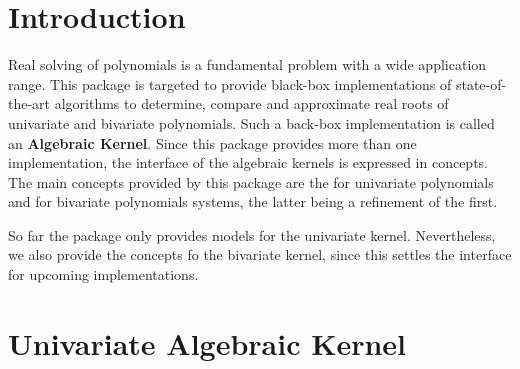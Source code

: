 
\section{Introduction}
Real solving of polynomials is a fundamental problem with a wide application range. 
This package is targeted to provide black-box implementations of state-of-the-art 
algorithms to determine, compare and approximate real roots of univariate and 
bivariate polynomials. Such a back-box implementation is called an {\bf Algebraic Kernel}. Since  
this package provides more than one implementation, the interface of the algebraic kernels 
is expressed in concepts. The main concepts provided by this package are the 
 for univariate polynomials and  
for bivariate polynomials systems, the latter being a refinement of the first. 

So far the package only provides models for the univariate kernel. Nevertheless, 
we also provide the concepts fo the bivariate kernel, since this settles the interface
for upcoming implementations.


\section{Univariate Algebraic Kernel}
